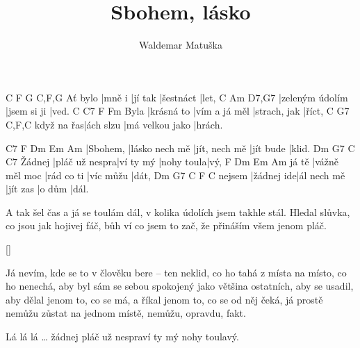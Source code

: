 \documentclass{song}
\title{Sbohem, lásko}
\author{Waldemar Matuška}
\begin{document}
\strophe
        C      F       G         C,F,G
Ať bylo |mně i |jí tak |šestnáct |let,
C               Am          D7,G7
|zeleným údolím |jsem si ji |ved.
     C          C7            F            Fm
Byla |krásná to |vím a já měl |strach, jak |říct,
           C         G7              C,F,C
když na řas|ách slzu |má velkou jako |hrách.
\endstrophe

C7       F              Dm            Em        Am
|Sbohem, |lásko nech mě |jít, nech mě |jít bude |klid.
       Dm             G7        C          C7
Žádnej |pláč už nespra|ví ty mý |nohy toula|vý,
      F              Dm         Em        Am
já tě |vážně měl moc |rád co ti |víc můžu |dát,
       Dm         G7          C        F      C
nejsem |žádnej ide|ál nech mě |jít zas |o dům |dál.
\endstrophe

\strophe*
A tak šel čas a já se toulám dál,
v kolika údolích jsem takhle stál.
Hledal slůvka, co jsou jak hojivej fáč,
bůh ví co jsem to zač, že přináším všem jenom pláč.
\endstrophe

\ref{}

\begin{recitative}
Já nevím, kde se to v člověku bere -- ten neklid,
co ho tahá z místa na místo, co ho nenechá,
aby byl sám se sebou spokojený jako většina ostatních,
aby se usadil, aby dělal jenom to, co se má,
a říkal jenom to, co se od něj čeká,
já prostě nemůžu zůstat na jednom místě, nemůžu, opravdu, fakt.
\end{recitative}

Lá lá lá \ldots
žádnej pláč už nespraví ty mý nohy toulavý.
\endstrophe
\end{document}
